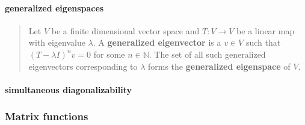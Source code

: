 \documentclass[letterpaper, 10pt]{article}
\theoremstyle{theostyle}
\begin{document}
\paragraph{generalized eigenspaces}
\begin{quote}
    Let \(V\) be a finite dimensional vector space and \(T: V \rightarrow V\) be a linear map with eigenvalue \(\lambda\).
    A \textbf{generalized eigenvector} is a \(v \in V\) such that \((T - \lambda I)^n v = 0\) for some \(n \in \mathbb{N}\).
    The set of all such generalized eigenvectors corresponding to \(\lambda\) forms the \textbf{generalized eigenspace} of \(V\).
\end{quote}

\paragraph{simultaneous diagonalizability}
\begin{quote}
\end{quote}

\subsubsection{Matrix functions}
\end{document}
